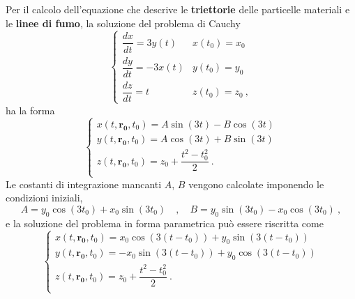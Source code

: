 \vspace{0.3cm}
Per il calcolo dell'equazione che descrive le \textbf{triettorie} delle particelle materiali e le \textbf{linee di fumo}, la soluzione del problema di Cauchy
\begin{equation}
 \begin{cases}
  \dfrac{dx}{dt} =  3y(t) & x(t_0) = x_0 \\
  \dfrac{dy}{dt} = -3x(t) & y(t_0) = y_0 \\
  \dfrac{dz}{dt} = t  &     z(t_0) = z_0 \ ,
 \end{cases}
\end{equation}
ha la forma
\begin{equation}
 \begin{cases}
  x(t,\bm{r_0},t_0) = A \sin(3t) - B \cos(3t) \\
  y(t,\bm{r_0},t_0) = A \cos(3t) + B \sin(3t) \\
  z(t,\bm{r_0},t_0) = z_0 + \dfrac{t^2 - t_0^2}{ 2 } \ .  \\
 \end{cases}
\end{equation}
Le costanti di integrazione mancanti $A$, $B$ vengono calcolate imponendo le condizioni iniziali,
\begin{equation}
  A = y_0 \cos(3t_0) + x_0 \sin(3t_0) \quad , \quad
  B = y_0 \sin(3t_0) - x_0 \cos(3t_0) \ ,
\end{equation}
e la soluzione del problema in forma parametrica può essere riscritta come
\begin{equation}
 \begin{cases}
  x(t,\bm{r_0},t_0) = x_0 \cos(3(t-t_0)) + y_0 \sin(3(t-t_0)) \\
  y(t,\bm{r_0},t_0) =-x_0 \sin(3(t-t_0)) + y_0 \cos(3(t-t_0)) \\
  z(t,\bm{r_0},t_0) = z_0 + \dfrac{t^2 - t_0^2}{ 2 } \ .  \\
 \end{cases}
\end{equation}


